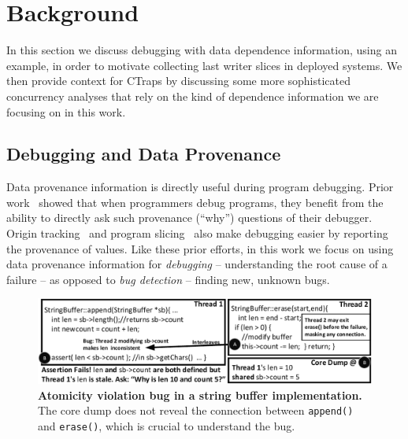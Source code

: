 \documentclass[preprint,9pt]{sigplanconf}
\newcommand{\ctraps}{CTraps\xspace}
\begin{document}
\section{Background}

In this section we discuss debugging with data dependence information, using an
example, in order to motivate collecting last writer slices in deployed
systems.  We then provide context for \ctraps by discussing some more
sophisticated concurrency analyses that rely on the kind of dependence
information we are focusing on in this work.


\subsection{Debugging and Data Provenance}

Data provenance information is directly useful during program debugging.  Prior
work~\cite{whylinechi,whylineicse} showed that when programmers debug
programs, they benefit from the ability to directly ask such provenance
(``why'') questions of their debugger.  Origin tracking~\cite{badapples} and
program slicing~\cite{tipslicingsurvey} also make debugging easier by reporting
the provenance of values.  Like these prior efforts, in this work we focus on
using data provenance information for {\em debugging} -- understanding the root
cause of a failure -- as opposed to {\em bug detection} -- finding new, unknown
bugs.

\begin{figure}[h]
\centering
\includegraphics[width=\columnwidth]{figs/JDKStringBufferFail.pdf}
\caption{\label{fig:coreDumpFail}{\bf Atomicity violation bug in a string buffer implementation.} The core dump does not reveal the connection between {\tt append()} and {\tt erase()}, which is crucial to understand the bug.}
\end{figure}
\end{document}
